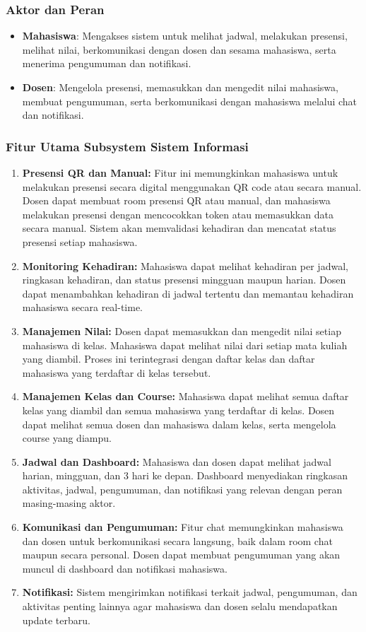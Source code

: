 \documentclass[a4paper,oneside,11pt]{book}
\begin{document}
\subsubsection{Aktor dan Peran}

\begin{itemize}
  \item \textbf{Mahasiswa}: Mengakses sistem untuk melihat jadwal, melakukan presensi, melihat nilai, berkomunikasi dengan dosen dan sesama mahasiswa, serta menerima pengumuman dan notifikasi.
  \item \textbf{Dosen}: Mengelola presensi, memasukkan dan mengedit nilai mahasiswa, membuat pengumuman, serta berkomunikasi dengan mahasiswa melalui chat dan notifikasi.
\end{itemize}

\subsubsection{Fitur Utama Subsystem Sistem Informasi}

\begin{enumerate}
  \item \textbf{Presensi QR dan Manual:} Fitur ini memungkinkan mahasiswa untuk melakukan presensi secara digital menggunakan QR code atau secara manual. Dosen dapat membuat room presensi QR atau manual, dan mahasiswa melakukan presensi dengan mencocokkan token atau memasukkan data secara manual. Sistem akan memvalidasi kehadiran dan mencatat status presensi setiap mahasiswa.
  \item \textbf{Monitoring Kehadiran:} Mahasiswa dapat melihat kehadiran per jadwal, ringkasan kehadiran, dan status presensi mingguan maupun harian. Dosen dapat menambahkan kehadiran di jadwal tertentu dan memantau kehadiran mahasiswa secara real-time.
  \item \textbf{Manajemen Nilai:} Dosen dapat memasukkan dan mengedit nilai setiap mahasiswa di kelas. Mahasiswa dapat melihat nilai dari setiap mata kuliah yang diambil. Proses ini terintegrasi dengan daftar kelas dan daftar mahasiswa yang terdaftar di kelas tersebut.
  \item \textbf{Manajemen Kelas dan Course:} Mahasiswa dapat melihat semua daftar kelas yang diambil dan semua mahasiswa yang terdaftar di kelas. Dosen dapat melihat semua dosen dan mahasiswa dalam kelas, serta mengelola course yang diampu.
  \item \textbf{Jadwal dan Dashboard:} Mahasiswa dan dosen dapat melihat jadwal harian, mingguan, dan 3 hari ke depan. Dashboard menyediakan ringkasan aktivitas, jadwal, pengumuman, dan notifikasi yang relevan dengan peran masing-masing aktor.
  \item \textbf{Komunikasi dan Pengumuman:} Fitur chat memungkinkan mahasiswa dan dosen untuk berkomunikasi secara langsung, baik dalam room chat maupun secara personal. Dosen dapat membuat pengumuman yang akan muncul di dashboard dan notifikasi mahasiswa.
  \item \textbf{Notifikasi:} Sistem mengirimkan notifikasi terkait jadwal, pengumuman, dan aktivitas penting lainnya agar mahasiswa dan dosen selalu mendapatkan update terbaru.
\end{enumerate}
\end{document}
